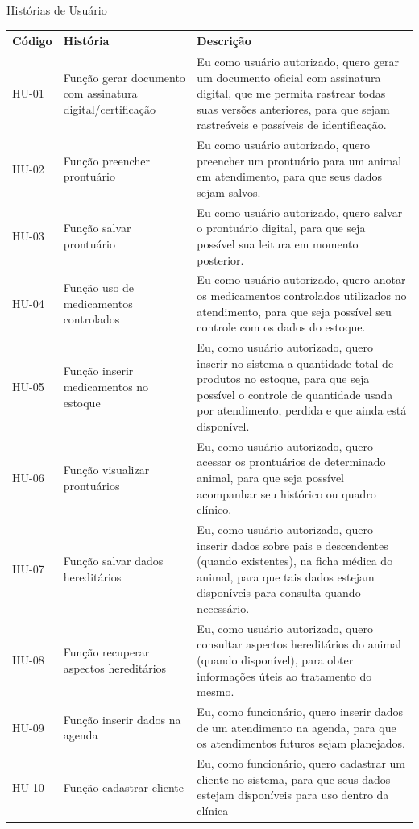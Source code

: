 \documentclass[
    12pt,               %
    openright,          %
    oneside,
    a4paper,            %
    BIBLATEX,           %
    TODO,               %
    english,            %
    brazil              %
    ]{ifsp-spo-inf-ctds}
\begin{document}
    
    \begin{center}
        \begin{quadro}[H]
        \caption{Histórias de Usuário}
        \begin{tabulary}{1.0\textwidth}{|p{5em}|p{8em}|p{18em}|}
        \hline
        Código & História & Descrição\\
        \hline
        HU-01 & Função gerar documento com assinatura digital/certificação & Eu como usuário autorizado, quero gerar um documento oficial com assinatura digital, que me permita rastrear todas suas versões anteriores, para que sejam rastreáveis e passíveis de identificação.\\
        \hline
        HU-02 & Função preencher prontuário & Eu como usuário autorizado, quero preencher um prontuário para um animal em atendimento, para que seus dados sejam salvos.\\
        \hline
        HU-03 & Função salvar prontuário & Eu como usuário autorizado, quero salvar o prontuário digital, para que seja possível sua leitura em momento posterior.\\
        \hline
        HU-04 & Função uso de medicamentos controlados & Eu como usuário autorizado, quero anotar os medicamentos controlados utilizados no atendimento, para que seja possível seu controle com os dados do estoque.\\
        \hline
        HU-05 & Função inserir medicamentos no estoque & Eu, como usuário autorizado, quero inserir no sistema a quantidade total de produtos no estoque, para que seja possível o controle de quantidade usada por atendimento, perdida e que ainda está disponível.\\
        \hline
        HU-06 & Função visualizar prontuários & Eu, como usuário autorizado, quero acessar os prontuários de determinado animal, para que seja possível acompanhar seu histórico ou quadro clínico.\\
        \hline
        HU-07 & Função salvar dados hereditários &  Eu, como usuário autorizado, quero inserir dados sobre pais e descendentes (quando existentes), na ficha médica do animal, para que tais dados estejam disponíveis para consulta quando necessário.\\
        \hline
        HU-08 &  Função recuperar aspectos hereditários &  Eu, como usuário autorizado, quero consultar aspectos hereditários do animal (quando disponível), para obter informações úteis ao tratamento do mesmo.\\
        \hline
        HU-09 & Função inserir dados na agenda & Eu, como funcionário, quero inserir dados de um atendimento na agenda, para que os atendimentos futuros sejam planejados.\\
        \hline
        HU-10 & Função cadastrar cliente & Eu, como funcionário, quero cadastrar um cliente no sistema, para que seus dados estejam disponíveis para uso dentro da clínica\\
        \hline
        \end{tabulary}
        

\end{quadro}
\end{center}
\end{document}
